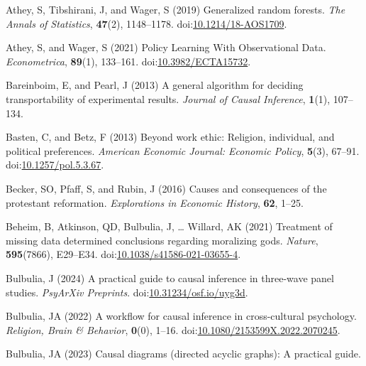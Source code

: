 \documentclass[
  single column]{article}
\newlength{\cslhangindent}
\newenvironment{CSLReferences}[2] %
 {\begin{list}{}{%
  \setlength{\itemindent}{0pt}
  \setlength{\leftmargin}{0pt}
  \setlength{\parsep}{0pt}
  \ifodd #1
   \setlength{\leftmargin}{\cslhangindent}
   \setlength{\itemindent}{-1\cslhangindent}
  \fi
  \setlength{\itemsep}{#2\baselineskip}}}
 {\end{list}}
\begin{document}
\newpage{}

\label{refs}
\begin{CSLReferences}{1}{0}
Athey, S, Tibshirani, J, and Wager, S (2019) Generalized random forests.
\emph{The Annals of Statistics}, \textbf{47}(2), 1148--1178.
doi:\href{https://doi.org/10.1214/18-AOS1709}{10.1214/18-AOS1709}.

Athey, S, and Wager, S (2021) Policy Learning With Observational Data.
\emph{Econometrica}, \textbf{89}(1), 133--161.
doi:\href{https://doi.org/10.3982/ECTA15732}{10.3982/ECTA15732}.

Bareinboim, E, and Pearl, J (2013) A general algorithm for deciding
transportability of experimental results. \emph{Journal of Causal
Inference}, \textbf{1}(1), 107--134.

Basten, C, and Betz, F (2013) Beyond work ethic: Religion, individual,
and political preferences. \emph{American Economic Journal: Economic
Policy}, \textbf{5}(3), 67--91.
doi:\href{https://doi.org/10.1257/pol.5.3.67}{10.1257/pol.5.3.67}.

Becker, SO, Pfaff, S, and Rubin, J (2016) Causes and consequences of the
protestant reformation. \emph{Explorations in Economic History},
\textbf{62}, 1--25.

Beheim, B, Atkinson, QD, Bulbulia, J, \ldots{} Willard, AK (2021)
Treatment of missing data determined conclusions regarding moralizing
gods. \emph{Nature}, \textbf{595}(7866), E29--E34.
doi:\href{https://doi.org/10.1038/s41586-021-03655-4}{10.1038/s41586-021-03655-4}.

Bulbulia, J (2024) A practical guide to causal inference in three-wave
panel studies. \emph{PsyArXiv Preprints}.
doi:\href{https://doi.org/10.31234/osf.io/uyg3d}{10.31234/osf.io/uyg3d}.

Bulbulia, JA (2022) A workflow for causal inference in cross-cultural
psychology. \emph{Religion, Brain \& Behavior}, \textbf{0}(0), 1--16.
doi:\href{https://doi.org/10.1080/2153599X.2022.2070245}{10.1080/2153599X.2022.2070245}.

Bulbulia, JA (2023) Causal diagrams (directed acyclic graphs): A
practical guide.


\end{CSLReferences}
\end{document}
